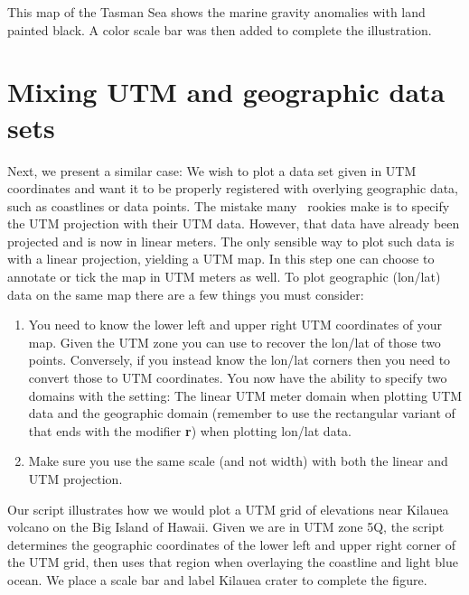 
This map of the Tasman Sea shows the marine gravity anomalies with land painted black.  A color scale bar
was then added to complete the illustration.

 


\section{Mixing UTM and geographic data sets}

Next, we present a similar case: We wish to plot a data set given in UTM coordinates and want it
to be properly registered with overlying geographic data, such as coastlines or data points.  The
mistake many \GMT\ rookies make is to specify the UTM projection with their UTM
data.  However, that data have already been projected and is now in linear meters.  The only
sensible way to plot such data is with a linear projection, yielding a UTM map.  In this step one can
choose to annotate or tick the map in UTM meters as well.  To plot geographic (lon/lat) data on
the same map there are a few things you must consider:
\begin{enumerate}
	\item You need to know the lower left and upper right UTM coordinates of your map. Given
	the UTM zone you can use  to recover the lon/lat of those two points.
	Conversely, if you instead know the lon/lat corners then you need to convert those
	to UTM coordinates.  You now have the ability to specify two domains with the  setting:
	The linear UTM meter domain when plotting UTM data and the geographic domain (remember to use the
	rectangular variant of  that ends with the modifier {\bf r}) when plotting lon/lat data.
	\item Make sure you use the same scale (and not width) with both the linear and UTM projection.
\end{enumerate}


Our script illustrates how we would plot a UTM grid of elevations near Kilauea volcano on the Big Island
of Hawaii.  Given we are in UTM zone 5Q, the script determines the geographic coordinates of the
lower left and upper right corner of the UTM grid, then uses that region when overlaying the coastline
and light blue ocean.  We place a scale bar and label Kilauea crater to complete the figure.

